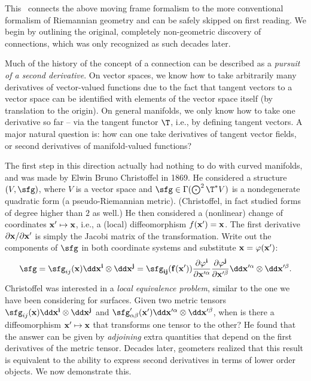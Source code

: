 This \sect\ connects the above moving frame formalism to the more conventional formalism of Riemannian geometry and can be safely skipped on first reading. We begin by outlining the original, completely non-geometric discovery of connections, which was only recognized as such decades later.


\begin{rem}
    Much of the history of the concept of a connection can be described as a \emph{pursuit of a second derivative}. On vector spaces, we know how to take arbitrarily many derivatives of vector-valued functions due to the fact that tangent vectors to a vector space can be identified with elements of the vector space itself (by translation to the origin). On general manifolds, we only know how to take one derivative so far -- via the tangent functor $\T$, i.e., by defining tangent vectors. A major natural question is: how can one take derivatives of tangent vector fields, or second derivatives of manifold-valued functions?

    The first step in this direction actually had nothing to do with curved manifolds, and was made by Elwin Bruno Christoffel in 1869. He considered a structure $(V,\sfg)$, where $V$ is a vector space and $\sfg\in \Gamma(\bigodot^2 \T^\ast V)$ is a nondegenerate quadratic form (a pseudo-Riemannian metric). (Christoffel, in fact studied forms of degree higher than $2$ as well.) He then considered a (nonlinear) change of coordinates $\bf{x}'\mapsto \bf{x}$, i.e., a (local) diffeomorphism $f(\bf{x}')=\bf{x}$. The first derivative $\partial\bf{x}\slash \partial\bf{x}'$ is simply the Jacobi matrix of the transformation. Write out the components of $\sfg$ in both coordinate systems and substitute $\bf{x}=\varphi(\bf{x}')$:
    \[\sfg=\sfg_{ij}(\bf{x})\dd x^i\otimes \dd x^j=\sfg_{ij}(f(\bf{x'}))\frac{\partial \varphi^i}{\partial x^{\prime \alpha}}\frac{\partial \varphi^j}{\partial x^{\prime \beta}}\dd x^{\prime\alpha}\otimes \dd x^{\prime\beta}.\label{eq 1215}\]
    Christoffel was interested in a \emph{local equivalence problem}, similar to the one we have been considering for surfaces. Given two metric tensors $\sfg_{ij}(\bf{x})\dd x^i\otimes \dd x^j$ and $\sfg'_{\alpha\beta}(\bf{x}')\dd x^{\prime\alpha}\otimes \dd x^{\prime\beta}$, when is there a diffeomorphism $\bf{x}'\mapsto \bf{x}$ that transforms one tensor to the other? He found that the answer can be given by \emph{adjoining} extra quantities that depend on the first derivatives of the metric tensor. Decades later, geometers realized that this result is equivalent to the ability to express second derivatives in terms of lower order objects. We now demonstrate this.


\end{rem}

